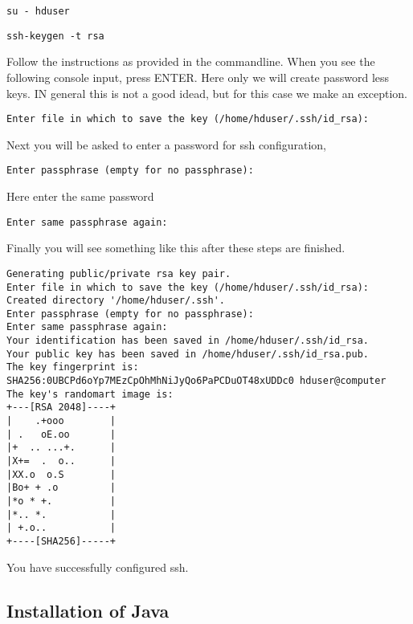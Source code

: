 \begin{lstlisting}
su - hduser
\end{lstlisting}

\begin{lstlisting}
ssh-keygen -t rsa
\end{lstlisting}

Follow the instructions as provided in the commandline.
When you see the following console input, press ENTER. Here only we
will create password less keys. IN general this is not a good idead,
but for this case we make an exception.

\begin{lstlisting}
Enter file in which to save the key (/home/hduser/.ssh/id_rsa):
\end{lstlisting}

Next you will be asked to enter a password for ssh configuration,

\begin{lstlisting}
Enter passphrase (empty for no passphrase):
\end{lstlisting}

Here enter the same password

\begin{lstlisting}
Enter same passphrase again:
\end{lstlisting}

Finally you will see something like this after these steps are finished.

\begin{lstlisting}
Generating public/private rsa key pair.
Enter file in which to save the key (/home/hduser/.ssh/id_rsa):
Created directory '/home/hduser/.ssh'.
Enter passphrase (empty for no passphrase):
Enter same passphrase again:
Your identification has been saved in /home/hduser/.ssh/id_rsa.
Your public key has been saved in /home/hduser/.ssh/id_rsa.pub.
The key fingerprint is:
SHA256:0UBCPd6oYp7MEzCpOhMhNiJyQo6PaPCDuOT48xUDDc0 hduser@computer
The key's randomart image is:
+---[RSA 2048]----+
|    .+ooo        |
| .   oE.oo       |
|+  .. ...+.      |
|X+=  .  o..      |
|XX.o  o.S        |
|Bo+ + .o         |
|*o * +.          |
|*.. *.           |
| +.o..           |
+----[SHA256]-----+
\end{lstlisting}

You have successfully configured ssh.

\subsection{Installation of Java}


